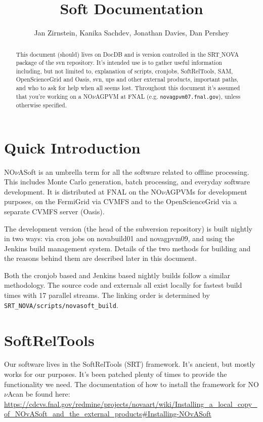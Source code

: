 \documentclass[letterpaper,10pt]{article}
\title{\nova Soft Documentation}
\author{Jan Zirnstein, Kanika Sachdev, Jonathan Davies, Dan Pershey}
\newcommand{\nova}{NO$\nu$A}
\newcommand{\novas}{\nova \space}
\begin{document}
\maketitle

\begin{abstract}
  This document (should) lives on DocDB and is version controlled in the SRT$\_$NOVA package of the svn repository. It's intended use is to gather useful information including, but not limited to, explanation of scripts, cronjobs, SoftRelTools, SAM, OpenScienceGrid and Oasis, svn, ups and other external products, important paths, and who to ask for help when all seems lost. Throughout this document it's assumed that you're working on a \novas GPVM at FNAL (e.g. \verb|novagpvm07.fnal.gov|), unless otherwise specified.
\end{abstract}

\tableofcontents


\section{Quick Introduction}
\nova Soft is an umbrella term for all the software related to offline processing. This includes Monte Carlo generation, batch processing, and everyday software development. It is distributed at FNAL on the \novas GPVMs for development purposes, on the FermiGrid via CVMFS and to the OpenScienceGrid via a separate CVMFS server (Oasis). 

The development version (the head of the subversion repository) is built nightly in two ways: via cron jobs on novabuild01 and novagpvm09, and using the Jenkins build management system. Details of the two methods for building and the reasons behind them are described later in this document.

Both the cronjob based and Jenkins based nightly builds follow a similar methodology. The source code and externals all exist locally for fastest build times with 17 parallel streams. The linking order is determined by \verb|SRT_NOVA/scripts/novasoft_build|.


\section{SoftRelTools}
Our software lives in the SoftRelTools (SRT) framework. It's ancient, but mostly works for our purposes. It's been patched plenty of times to provide the functionality we need. The documentation of how to install the framework for \novas can be found here: \url{https://cdcvs.fnal.gov/redmine/projects/novaart/wiki/Installing_a_local_copy_of_NOvASoft_and_the_external_products#Installing-NOvASoft}
\end{document}
